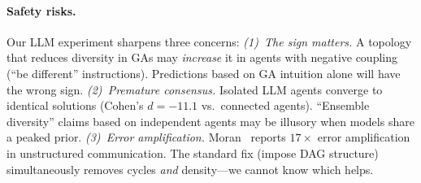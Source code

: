 \documentclass[10pt,twocolumn]{article}
\begin{document}
\begin{table}[t]
\centering
\caption{Agent systems whose topology choices lack controlled evidence.}
\label{tab:systems}
\footnotesize
{}
\end{table}

\paragraph{Safety risks.}
Our LLM experiment sharpens three concerns:
\emph{(1)~The sign matters.} A topology that reduces diversity in
GAs may \emph{increase} it in agents with negative coupling (``be
different'' instructions). Predictions based on GA intuition alone
will have the wrong sign.
\emph{(2)~Premature consensus.} Isolated LLM agents converge to
identical solutions (Cohen's $d = -11.1$ vs.\ connected agents).
``Ensemble diversity'' claims based on independent agents may be
illusory when models share a peaked prior.
\emph{(3)~Error amplification.} Moran~\citep{moran2025error} reports
$17\times$ error amplification in unstructured communication. The
standard fix (impose DAG structure) simultaneously removes cycles
\emph{and} density---we cannot know which helps.
\end{document}

